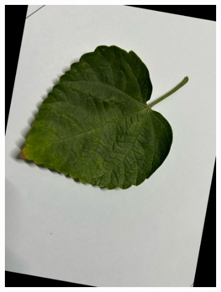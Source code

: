 \documentclass[twocolumn]{article}
\begin{document}
\begin{figure}[H]
\begin{subfigure}[b]{0.30\columnwidth}
        \includegraphics[width=\textwidth]{rosa8}
    \end{subfigure}
    \hfill
    \begin{subfigure}[b]{0.30\columnwidth}

\end{subfigure}
\end{figure}
\end{document}
